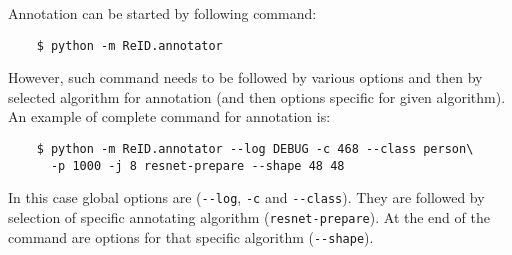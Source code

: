 Annotation can be started by following command:
\begin{verbatim}
    $ python -m ReID.annotator
\end{verbatim}
However, such command needs to be followed by various options and then by selected
algorithm for annotation (and then options specific for given algorithm). An example of 
complete command for annotation is:
\begin{verbatim}
    $ python -m ReID.annotator --log DEBUG -c 468 --class person\
      -p 1000 -j 8 resnet-prepare --shape 48 48
\end{verbatim}

In this case global options are (\verb+--log+, \verb+-c+ and \verb+--class+). They are 
followed by selection of specific annotating algorithm (\verb+resnet-prepare+). At 
the end of the command are options for that specific algorithm (\verb+--shape+).





